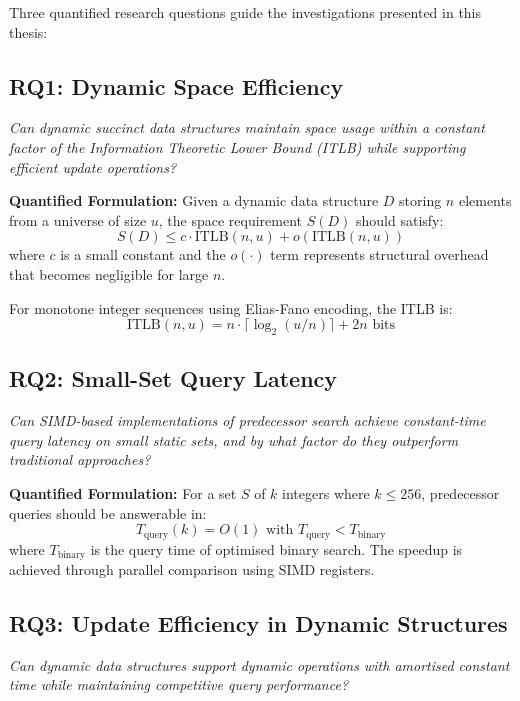 Three quantified research questions guide the investigations presented in this thesis:

\subsection{RQ1: Dynamic Space Efficiency}
\textit{Can dynamic succinct data structures maintain space usage within a constant factor of the Information Theoretic Lower Bound (ITLB) while supporting efficient update operations?}

\textbf{Quantified Formulation:} Given a dynamic data structure $D$ storing $n$ elements from a universe of size $u$, the space requirement $S(D)$ should satisfy:
\begin{equation}
    S(D) \leq c \cdot \text{ITLB}(n, u) + o(\text{ITLB}(n, u))
\end{equation}
where $c$ is a small constant and the $o(\cdot)$ term represents structural overhead that becomes negligible for large $n$.

For monotone integer sequences using Elias-Fano encoding, the ITLB is:
\begin{equation}
    \text{ITLB}(n, u) = n \cdot \lceil \log_2(u/n) \rceil + 2n \text{ bits}
\end{equation}

\subsection{RQ2: Small-Set Query Latency}
\textit{Can SIMD-based implementations of predecessor search achieve constant-time query latency on small static sets, and by what factor do they outperform traditional approaches?}

\textbf{Quantified Formulation:} For a set $S$ of $k$ integers where $k \leq 256$, predecessor queries should be answerable in:
\begin{equation}
    T_{\text{query}}(k) = O(1) \text{ with } T_{\text{query}} < T_{\text{binary}}
\end{equation}
where $T_{\text{binary}}$ is the query time of optimised binary search. The speedup is achieved through parallel comparison using SIMD registers.

\subsection{RQ3: Update Efficiency in Dynamic Structures}
\textit{Can dynamic data structures support dynamic operations with amortised constant time while maintaining competitive query performance?}

